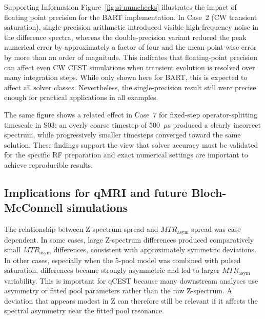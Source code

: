 \documentclass[11pt,a4paper]{article}
\begin{document}
Supporting Information Figure~\ref{fig:si-numchecks} illustrates the impact of floating point precision
for the BART implementation.
In Case~2 (CW transient saturation), single-precision arithmetic introduced visible high-frequency noise in the difference spectra, whereas the double-precision variant reduced the peak numerical error by approximately a factor of four and the mean point-wise error by more than an order of magnitude. 
This indicates that floating-point precision can affect even CW CEST simulations when transient evolution is resolved over many integration steps.
While only shown here for BART, this is expected to affect all solver classes.
Nevertheless, the single-precision result still were precise enough
for practical applications in all examples.

The same figure shows a related effect in Case~7 for fixed-step operator-splitting timescale in S03: an overly coarse timestep of 500~$\mu$s produced a clearly incorrect spectrum, while progressively smaller timesteps converged toward the same solution. These findings support the view that solver accuracy must be validated for the specific RF preparation and exact numerical settings are important to achieve reproducible results.



\subsection{Implications for qMRI and future Bloch-McConnell simulations}
The relationship between Z-spectrum spread and $MTR_{\mathrm{asym}}$ spread was case dependent. In some cases, large Z-spectrum differences produced comparatively small $MTR_{\mathrm{asym}}$ differences, consistent with approximately symmetric deviations.
In other cases, especially when the 5-pool model was combined with pulsed saturation, differences became strongly asymmetric and led to larger $MTR_{\mathrm{asym}}$ variability. This is important for qCEST because many downstream analyses use asymmetry or fitted pool parameters rather than the raw Z-spectrum. A deviation that appears modest in Z can therefore still be relevant if it affects the spectral asymmetry near the fitted pool resonance.
\end{document}

